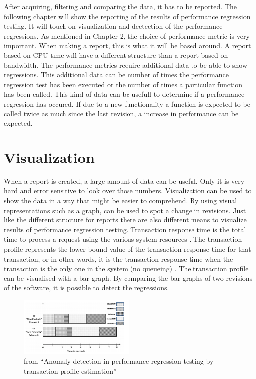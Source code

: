 After acquiring, filtering and comparing the data, it has to be reported. The following chapter will show the reporting of the results of performance regression testing. It will touch on visualization and dectection of the performance regressions. \newline
\newline
As mentioned in Chapter 2, the choice of performance metric is very important. When making a report, this is what it will be based around. A report based on CPU time will have a different structure than a report based on bandwidth. The performance metrics require additional data to be able to show regressions. This additional data can be number of times the performance regression test has been executed or the number of times a particular function has been called. This kind of data can be usefull to determine if a performance regression has occured. If due to a new functionality a function is expected to be called twice as much since the last revision, a increase in performance can be expected.\newline

\section{Visualization}
When a report is created, a large amount of data can be useful. Only it is very hard and error sensitive to look over those numbers. Visualization can be used to show the data in a way that might be easier to comprehend. By using visual representations such as a graph, can be used to spot a change in revisions. Just like the different structure for reports there are also different means to visualize results of performance regression testing.\newline
Transaction response time is the total time to process a request using the various
system resources \cite{jain2008art}. The transaction profile represents the lower bound value of the transaction response time for that transaction, or in other words, it is the
transaction response time when the transaction is the only one in the system (no queueing) \cite{ghaith2015anomaly}.\newline
The transaction profile can be visualised with a bar graph. By comparing the bar graphs of two revisions of the software, it is possible to detect the regressions.

\begin{figure}[h]
\begin{center}
  \includegraphics[width=0.5\textwidth]{Figures/TP.png}
\end{center}
  \caption{from ``Anomaly detection in performance regression testing by transaction profile estimation''\cite{ghaith2015anomaly}}

\end{figure}

